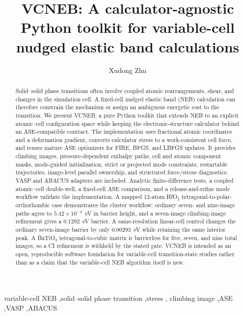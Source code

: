 \documentclass[final,3p,times]{elsarticle}
\begin{document}
\begin{frontmatter}
\title{VCNEB: A calculator-agnostic Python toolkit for variable-cell nudged elastic band calculations}

\author{Xudong Zhu}
\address{VCNEB developers, China}

\begin{abstract}
Solid--solid phase transitions often involve coupled atomic rearrangements,
shear, and changes in the simulation cell.  A fixed-cell nudged elastic band
(NEB) calculation can therefore constrain the mechanism or assign an
ambiguous energetic cost to the transition.  We present VCNEB, a pure Python
toolkit that extends NEB to an explicit atomic--cell configuration space while
keeping the electronic-structure calculator behind an ASE-compatible contract.
The implementation uses fractional atomic coordinates and a deformation
gradient, converts calculator stress to a work-consistent cell force, and
reuses mature ASE optimizers for FIRE, BFGS, and LBFGS updates.  It provides
climbing images, pressure-dependent enthalpy paths, cell and atomic component
masks, mode-guided initialization, strict or projected mode constraints,
restartable trajectories, image-level parallel ownership, and structured
force/stress diagnostics.  VASP and ABACUS adapters are included.  Analytic
finite-difference tests, a coupled atomic--cell double-well, a fixed-cell ASE
comparison, and a release-and-refine mode workflow validate the implementation.
A mapped 12-atom HfO$_2$ tetragonal-to-polar-orthorhombic case demonstrates the
cluster workflow: ordinary seven- and nine-image paths agree to
$5.42\times10^{-4}$~eV in barrier height, and a seven-image climbing-image
refinement gives a $0.1292$~eV barrier.  A same-resolution linear-cell control
changes the ordinary seven-image barrier by only $0.00293$~eV while retaining
the same interior peak.  A BaTiO$_3$ tetragonal-to-cubic matrix
is barrierless for five, seven, and nine total images, so a CI refinement is
withheld by the stated gate.  VCNEB is intended as an open, reproducible
software foundation for variable-cell transition-state studies rather than as
a claim that the variable-cell NEB algorithm itself is new.
\end{abstract}

\begin{keyword}
variable-cell NEB \sep solid--solid phase transition \sep stress \sep
climbing image \sep ASE \sep VASP \sep ABACUS
\end{keyword}
\end{frontmatter}
\end{document}
